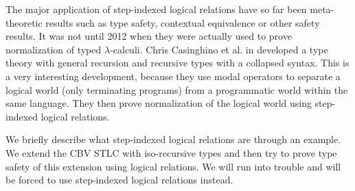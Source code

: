 The major application of step-indexed logical relations have so far been
meta-theoretic results such as type safety, contextual equivalence or
other safety results. It was not until 2012 when they were actually
used to prove normalization of typed $\lambda$-calculi.  Chris
Casinghino et al. in \cite{Casinghino:2012} developed a type theory
with general recursion and recursive types with a collapsed syntax.
This is a very interesting development, because they use modal
operators to separate a logical world (only terminating programs) from
a programmatic world within the same language.  They then prove
normalization of the logical world using step-indexed logical relations.

We briefly describe what step-indexed logical relations are through an
example.  We extend the CBV STLC with iso-recursive types and then try
to prove type safety of this extension using logical relations.  We
will run into trouble and will be forced to use step-indexed logical
relations instead.







